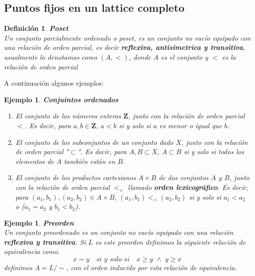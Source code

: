 \documentclass[executivepaper]{article}
\newtheorem{defi}[propo]{Definición}
\newtheorem{ejemplo}[propo]{Ejemplo}
\begin{document}
\subsection{Puntos fijos en un lattice completo}
\begin{defi}\textbf{Poset}\\
    Un conjunto parcialmente ordenado o poset, es un conjunto no vacío equipado con una relación de orden parcial, es decir \textbf{reflexiva, antisimetrica y transitiva}, usualmente lo denotamos como $(A,<)$, donde $A$ es el conjunto y $<$ es la relación de orden parcial
\end{defi}
A continuación algunos ejemplos:
\begin{ejemplo}\textbf{Conjuintos ordenados}
    \begin{enumerate} 
        \item El conjunto de los números enteros $\mathbf{Z}$, junto con la relación de orden parcial $<$. Es decir, para $a, b \in \mathbf{Z}$, $a < b$ si y solo si $a$ es menor o igual que $b$.
        \item El conjunto de los subconjuntos de un conjunto dado $X$, junto con la relación de orden parcial "$\subset$". Es decir, para $A, B \subset X$, $A \subset B$ si y solo si todos los elementos de $A$ también están en $B$.
        \item El conjunto de los productos cartesianos $A \times B$ de dos conjuntos $A$ y $B$, junto con la relación de orden parcial $<_{\times}$ llamado \textbf{orden lexicográfico}. Es decir, para $(a_1,b_1),(a_2,b_2) \in A \times B$, $(a_1,b_1) <_{\times} (a_2,b_2)$ si y solo si $a_1 < a_2$ o ($a_1 = a_2$ y $b_1 < b_2$).
    \end{enumerate}
\end{ejemplo}
\begin{ejemplo}\textbf{Preorden}\\
    Un conjunto preordenado es un conjunto no vacío equipado con una relación \textbf{reflexiva y transitiva}. Si $L$ es este preorden definimos la siguiente relación de equivalencia como.
    $$x \sim y \quad si\,\, y \,\, solo \,\, si \quad x \geq y \,\, \land \,\, y \geq x$$ 
    definimos $A = L/\sim$, con el orden inducido por esta relación de equivalencia.
\end{ejemplo}
\end{document}
